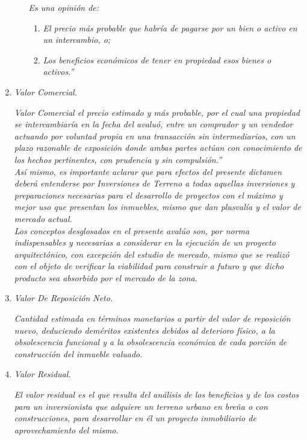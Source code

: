 \begin{enumerate}
\begin{enumerate}
\textit{Es una opini\'on de: }
\begin{enumerate}

\item\textit{ El precio m\'as probable que habr\'ia de pagarse por un bien o activo en un intercambio, o;} 
\item \textit{Los beneficios econ\'omicos de tener en propiedad esos bienes o activos.''}

\end{enumerate}
\end{enumerate}

\item  \textcolor{principal}{\textit{Valor Comercial. }}

\textit{Valor Comercial el precio estimado y m\'as probable, por el cual una propiedad se intercambiar\'ia en la fecha del avalu\'o, entre un comprador y un vendedor actuando por voluntad propia en una transacci\'on sin intermediarios, con un plazo razonable de exposici\'on donde ambas partes act\'uan con conocimiento de los hechos pertinentes, con prudencia y sin compulsi\'on.''}\\

\textit{As\'i mismo, es importante aclarar que para efectos del presente dictamen deber\'a entenderse por Inversiones de Terreno a todas aquellas inversiones y preparaciones necesarias para el desarrollo de proyectos con el m\'aximo y mejor uso que presentan los inmuebles, mismo que dan plusval\'ia y el valor de mercado actual. }\\

\textit{Los conceptos desglosados en el presente aval\'uo son, por norma indispensables y necesarias a considerar en la ejecuci\'on de un proyecto arquitect\'onico, con excepci\'on del estudio de mercado, mismo que se realiz\'o con el objeto de verificar la viabilidad para construir a futuro y que dicho producto sea absorbido por el mercado de la zona. }\\

\item \textcolor{principal}{\textit{Valor De Reposici\'on Neto.}}

\textit{Cantidad estimada en t\'erminos monetarios a partir del valor de reposici\'on nuevo, deduciendo dem\'eritos existentes debidos al deterioro f\'isico, a la obsolescencia funcional y a la obsolescencia econ\'omica de cada porci\'on de construcci\'on del inmueble valuado.}

\item \textcolor{principal}{ \textit{Valor Residual.}}

\textit{El valor residual es el que resulta del an\'alisis de los beneficios y de los costos para un inversionista que adquiere un terreno urbano en bre\~na o con construcciones, para desarrollar en \'el un proyecto inmobiliario de aprovechamiento del mismo.}

\end{enumerate}

